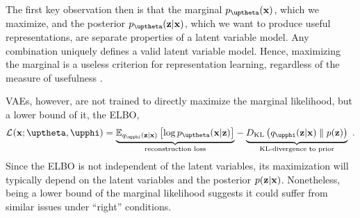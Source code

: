 The first key observation then is that the marginal $p_{\thetab}(\xb)$, which we maximize, and the posterior $p_{\thetab}(\zb|\xb)$, which we want to produce useful representations, are separate properties of a latent variable model. Any combination uniquely defines a valid latent variable model. Hence, maximizing the marginal is a useless criterion for representation learning, regardless of the measure of usefulness \parencite{huszar_is_2017, alemi_fixing_2018}. 

VAEs, however, are not trained to directly maximize the marginal likelihood, but a lower bound of it, the ELBO,
%
\begin{equation} \label{eq:variational-autoencoder-elbo-factorized (discussion copy)}
    \mathcal{L}_{}(\xb;\thetab,\phib)
    = 
    \underset{\text{reconstruction loss}}{\underbrace{
        \mathbb{E}_{q_\phib(\zb|\xb)}\left[\log p_\thetab(\xb|\zb)\right]
    }}
     - 
    \underset{\text{KL-divergence to prior}}{
        \underbrace{\vphantom{\mathbb{E}_{q_\phib(\zb|\xb)}\left[\log p_\thetab(\xb|\zb)\right]}{D_\text{KL}\left( q_\phib(\zb|\xb) \parallel p(\zb) \right)}
    }} \enspace .
\end{equation}
%
Since the ELBO is not independent of the latent variables, its maximization will typically depend on the latent variables and the posterior $p({\mathbf{z}}|{\mathbf{x}})$. Nonetheless, being a lower bound of the marginal likelihood suggests it could suffer from similar issues under ``right'' conditions.


